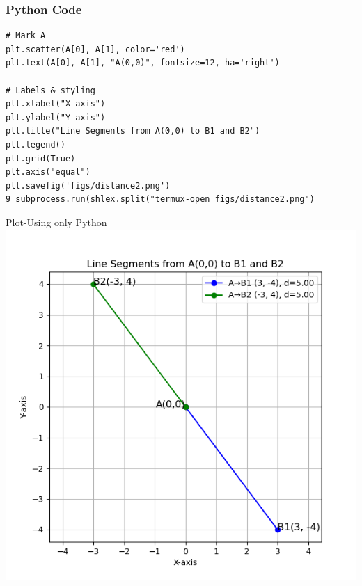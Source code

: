 \documentclass{beamer}
\begin{document}
\begin{frame}[fragile]
    \frametitle{Python Code }
    \begin{lstlisting}
# Mark A
plt.scatter(A[0], A[1], color='red')
plt.text(A[0], A[1], "A(0,0)", fontsize=12, ha='right')

# Labels & styling
plt.xlabel("X-axis")
plt.ylabel("Y-axis")
plt.title("Line Segments from A(0,0) to B1 and B2")
plt.legend()
plt.grid(True)
plt.axis("equal")
plt.savefig('figs/distance2.png')
9 subprocess.run(shlex.split("termux-open figs/distance2.png")

\end{lstlisting}
\end{frame}




\begin{frame}{Plot-Using only Python}
    \centering
    \includegraphics[width=\columnwidth, height=0.8\textheight, keepaspectratio]{figs/distance2.png}     
\end{frame}
\end{document}
